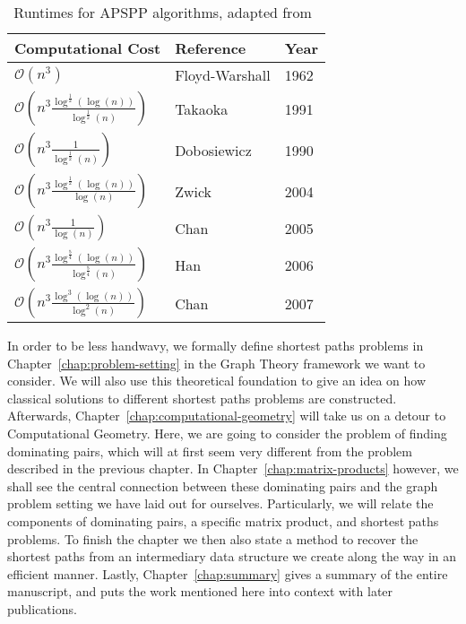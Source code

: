 \setlength{\tabcolsep}{18pt}
\renewcommand{\arraystretch}{1.5}
\begin{table}
    \centering
    \begin{tabular}{| l | l | l |}
        \hline
        Computational Cost & Reference & Year \\
        \hline
        $\mathcal{O}\left( n^3 \right)$ & Floyd-Warshall & 1962 \\
        $\mathcal{O}\left( n^3 \frac{\log^{\frac{1}{2}}(\log(n))}{\log^{\frac{1}{2}}(n)} \right)$ & Takaoka~\cite{Takaoka1992} & 1991 \\
        $\mathcal{O}\left( n^3 \frac{1}{\log^{\frac{1}{2}}(n)} \right)$ & Dobosiewicz~\cite{Dobosiewicz2007} & 1990 \\
        $\mathcal{O}\left( n^3 \frac{\log^{\frac{1}{2}}(\log(n))}{\log(n)} \right)$ & Zwick~\cite{Zwick2004} & 2004 \\
        $\mathcal{O}\left( n^3 \frac{1}{\log(n)} \right)$ & Chan~\cite{Chan2007} & 2005 \\
        $\mathcal{O}\left( n^3 \frac{\log^{\frac{5}{4}}(\log(n))}{\log^{\frac{5}{4}}(n)} \right)$ & Han~\cite{Han2008} & 2006 \\
        $\mathcal{O}\left( n^3 \frac{\log^3(\log(n))}{\log^2(n)} \right)$ & Chan~\cite{Chan2010} & 2007 \\
        \hline
    \end{tabular}
    \caption{Runtimes for APSPP algorithms, adapted from~\cite[Table~1.1]{Chan2010}\label{tab:runtimes}}
\end{table}

In order to be less handwavy, we formally define shortest paths problems in Chapter~\ref{chap:problem-setting} in the Graph Theory framework we want to consider.
We will also use this theoretical foundation to give an idea on how classical solutions to different shortest paths problems are constructed.
Afterwards, Chapter~\ref{chap:computational-geometry} will take us on a detour to Computational Geometry.
Here, we are going to consider the problem of finding dominating pairs, which will at first seem very different from the problem described in the previous chapter.
In Chapter~\ref{chap:matrix-products} however, we shall see the central connection between these dominating pairs and the graph problem setting we have laid out for ourselves.
Particularly, we will relate the components of dominating pairs, a specific matrix product, and shortest paths problems.
To finish the chapter we then also state a method to recover the shortest paths from an intermediary data structure we create along the way in an efficient manner.
Lastly, Chapter~\ref{chap:summary} gives a summary of the entire manuscript, and puts the work mentioned here into context with later publications.
